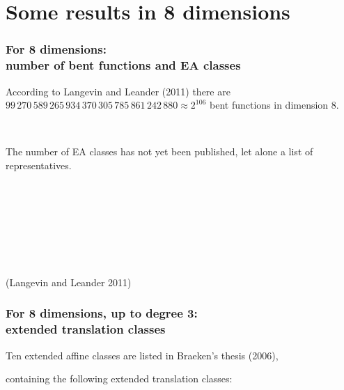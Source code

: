 \documentclass[pdf,sprung,slideColor,nocolorBG]{beamer}
\newenvironment{colortheme}[1]{
\def\ProvidesPackageRCS $##1${\relax}
\renewcommand{\ProcessOptions}{\relax}
\makeatletter

\makeatother
}{}
\newcommand{\slidecite}[1]{\tiny{(#1)}\normalsize{}}
\begin{document}
\section{Some results in 8 dimensions}


\begin{colortheme}{seagull}

\begin{frame}
\frametitle{For 8 dimensions: \\ number of bent functions and EA classes}

According to Langevin and Leander (2011)
there are $99\,270\,589\,265\,934\,370\,305\,785\,861\,242\,880 \approx 2^{106}$ bent functions in dimension 8.

~

The number of EA classes has not yet been published, let alone a list of representatives.

~

~

~

~

\slidecite{Langevin and Leander 2011}
\end{frame}

\begin{frame}
\frametitle{For 8 dimensions, up to degree 3: \\ extended translation classes}

Ten extended affine classes are listed in Braeken's thesis (2006),

containing the following extended translation classes:


\end{frame}
\end{colortheme}
\end{document}
